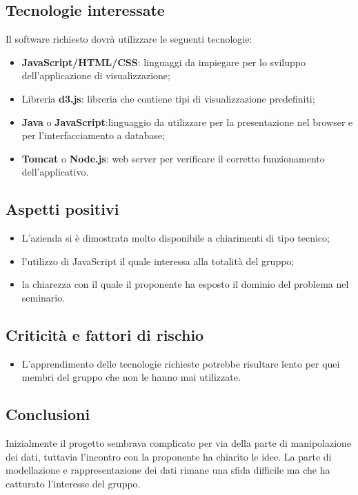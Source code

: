 \subsection{Tecnologie interessate}
Il software richiesto dovrà utilizzare le seguenti tecnologie:
\begin{itemize}
	\item \textbf{JavaScript/HTML/CSS}: linguaggi da impiegare per lo sviluppo dell'applicazione di visualizzazione;
	\item Libreria \textbf{d3.js}: libreria che contiene tipi di visualizzazione predefiniti;
	\item \textbf{Java} o \textbf{JavaScript}:linguaggio da utilizzare per la presentazione nel browser e per l'interfacciamento a database;
	\item \textbf{Tomcat} o \textbf{Node.js}: web server per verificare il corretto funzionamento dell'applicativo.
\end{itemize}
\subsection{Aspetti positivi}
\begin{itemize}
	\item L'azienda si è dimostrata molto disponibile a chiarimenti di tipo tecnico;
	\item l'utilizzo di JavaScript il quale interessa alla totalità del gruppo;
	\item la chiarezza con il quale il proponente ha esposto il dominio del problema nel seminario.
\end{itemize}
\subsection{Criticità e fattori di rischio}
\begin{itemize}
	\item L'apprendimento delle tecnologie richieste potrebbe risultare lento per quei membri del gruppo che non le hanno mai utilizzate.
\end{itemize}
\subsection{Conclusioni}
Inizialmente il progetto sembrava complicato per via della parte di manipolazione dei dati, tuttavia l'incontro con la proponente ha chiarito le idee. La parte di modellazione e rappresentazione dei dati rimane una sfida difficile ma che ha catturato l'interesse del gruppo.
